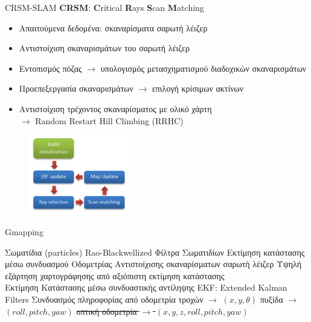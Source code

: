 \documentclass[10pt, compress]{beamer}
\begin{document}
\begin{frame}{CRSM-SLAM}
	\textbf{CRSM}: \textbf{C}ritical \textbf{R}ays \textbf{S}can \textbf{M}atching
	
	\begin{itemize}
		\item Απαιτούμενα δεδομένα: σκαναρίσματα σαρωτή λέιζερ
		\item Αντιστοίχιση σκαναρισμάτων του σαρωτή λέιζερ
		\item Εντοπισμός πόζας $\rightarrow$ υπολογισμός μετασχηματισμού διαδοχικών σκαναρισμάτων
		\item Προεπεξεργασία σκαναρισμάτων $\rightarrow$ επιλογή κρίσιμων ακτίνων
		\item Αντιστοίχιση τρέχοντος σκαναρίσματος με ολικό χάρτη\\
		$\rightarrow$ Random Restart Hill Climbing (RRHC)
	\end{itemize}
	\begin{figure}
		\includegraphics[height=3.5cm]{Figures/crsm_slam_diagram.png}
	\end{figure}
\end{frame}

\begin{frame}{Gmapping}
	\begin{outline}
		\1 Σωματίδια (particles)
		\1 Rao-Blackwellized Φίλτρα Σωματιδίων
		\1 Εκτίμηση κατάστασης μέσω συνδυασμού
			\2 Οδομετρίας
			\2 Αντιστοίχισης σκαναρίσματων σαρωτή λέιζερ
		\1 Υψηλή εξάρτηση χαρτογράφησης από αξιόπιστη εκτίμηση κατάστασης\\[0.5cm]
		
		Εκτίμηση Κατάστασης μέσω συνδυαστικής αντίληψης
		\1 EKF: Extended Kalman Filters
		\1 Συνδυασμός πληροφορίας από 
			\2 οδομετρία τροχών $\rightarrow$ $(x,y,\theta)$
			\2 πυξίδα $\rightarrow$ $(roll,pitch,yaw)$
			\2 \sout{οπτική οδομετρία $\rightarrow$ $(x,y,z,roll,pitch,yaw)$}
	\end{outline}
\end{frame}
\end{document}
